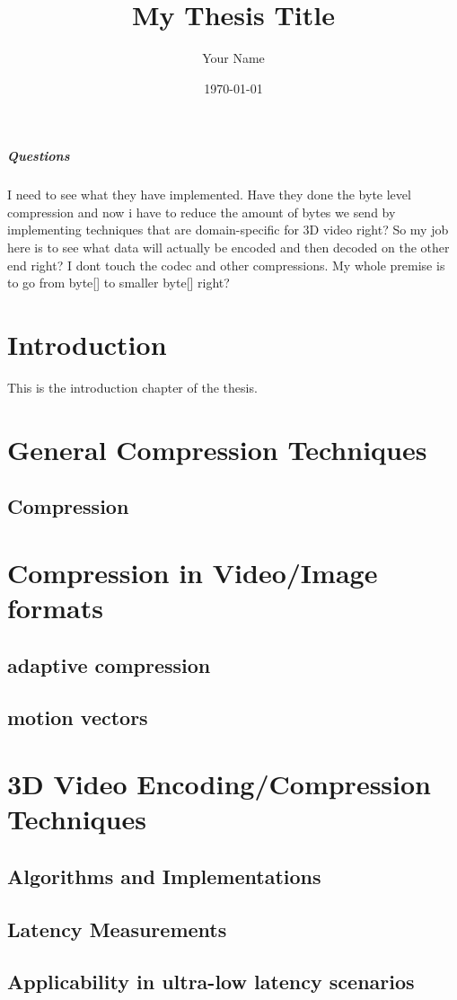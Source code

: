 \documentclass[12pt,a4paper]{report}
\title{My Thesis Title}
\author{Your Name}
\date{\today}
\begin{document}
\maketitle
\paragraph{Questions}

I need to see what they have implemented. Have they done the byte level compression and now i have to reduce the amount of bytes we send by implementing techniques that are domain-specific for 3D video right? So my job here is to see what data will actually be encoded and then decoded on the other end right? I dont touch the codec and other compressions. My whole premise is to go from byte[] to smaller byte[] right?

\tableofcontents

\chapter{Introduction}
This is the introduction chapter of the thesis.

\chapter{General Compression Techniques}
\section{Compression}

\chapter{Compression in Video/Image formats}
\section{adaptive compression}
\section{motion vectors}

\chapter{3D Video Encoding/Compression Techniques}
\section{Algorithms and Implementations}
\section{Latency Measurements}
\section{Applicability in ultra-low latency scenarios}
\end{document}
